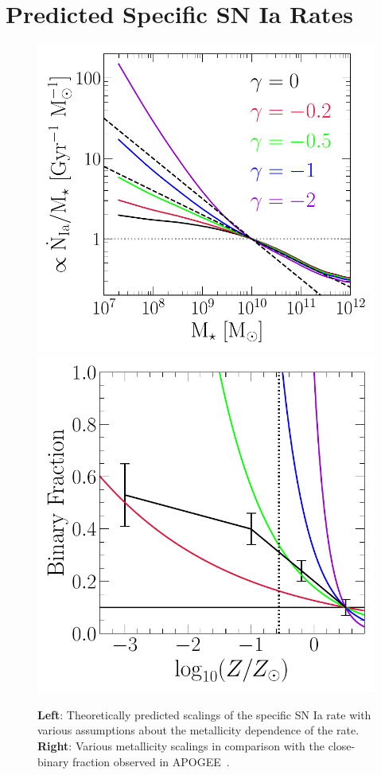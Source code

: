 \documentclass[ms.tex]{subfiles}
\begin{document}
\section{Predicted Specific SN Ia Rates}
\label{sec:predictions}

\begin{figure}
\centering
\includegraphics[scale = 0.55]{umachine_iarate_metdep.pdf}
\includegraphics[scale = 0.55]{binaries_zscaling.pdf}
\caption{
\textbf{Left}: Theoretically predicted scalings of the specific SN Ia rate with
various assumptions about the metallicity dependence of the rate.
\textbf{Right}: Various metallicity scalings in comparison with the
close-binary fraction observed in APOGEE~\citep{Moe2019}.
}
\label{fig:specia_metdep}
\end{figure}
\end{document}
